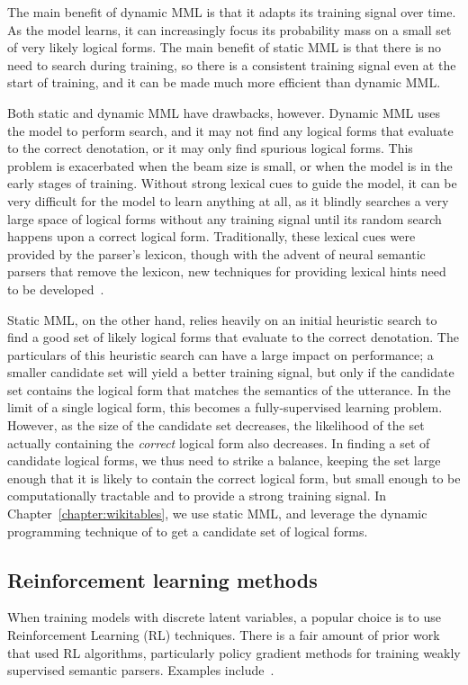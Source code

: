 The main benefit of dynamic MML is that it adapts its training signal over
time.  As the model learns, it can increasingly focus its probability mass on a
small set of very likely logical forms.  The main benefit of static MML is that
there is no need to search during training, so there is a consistent training
signal even at the start of training, and it can be made much more efficient
than dynamic MML\@.

Both static and dynamic MML have drawbacks, however.  Dynamic MML uses the
model to perform search, and it may not find any logical forms that evaluate to
the correct denotation, or it may only find spurious logical forms.  This
problem is exacerbated when the beam size is small, or when the model is in the
early stages of training.  Without strong lexical cues to guide the model, it
can be very difficult for the model to learn anything at all, as it blindly
searches a very large space of logical forms without any training signal until
its random search happens upon a correct logical form.  Traditionally, these
lexical cues were provided by the parser's lexicon, though with the advent of
neural semantic parsers that remove the lexicon, new techniques for providing
lexical hints need to be developed~\cite{goldman2017weakly}.

Static MML, on the other hand, relies heavily on an initial heuristic search to
find a good set of likely logical forms that evaluate to the correct
denotation.  The particulars of this heuristic search can have a large impact
on performance; a smaller candidate set will yield a better training signal,
but only if the candidate set contains the logical form that matches the
semantics of the utterance.  In the limit of a single logical form, this
becomes a fully-supervised learning problem.  However, as the size of the
candidate set decreases, the likelihood of the set actually containing the
\emph{correct} logical form also decreases.  In finding a set of candidate
logical forms, we thus need to strike a balance, keeping the set large enough
that it is likely to contain the correct logical form, but small enough to be
computationally tractable and to provide a strong training signal.
In Chapter~\ref{chapter:wikitables}, we use static MML, and leverage the dynamic
programming technique of \citet{pasupat2016inferring} to get a candidate set of logical
forms.

\subsection{Reinforcement learning methods}
When training models with discrete latent variables, a popular choice is to use
Reinforcement Learning (RL) techniques. There is a fair amount of prior work that
used RL algorithms, particularly policy gradient methods for training weakly
supervised semantic parsers. Examples
include~\cite{Andreas2016LearningTC,Liang2016NeuralSM,guu2017bridging,liang2018memory}.

